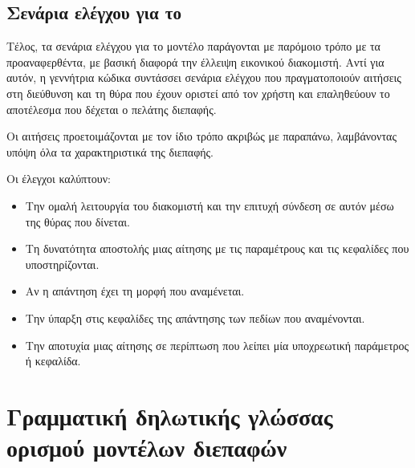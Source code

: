 \subsection{Σενάρια ελέγχου για το }

Τέλος, τα σενάρια ελέγχου για το μοντέλο  παράγονται με παρόμοιο τρόπο με τα προαναφερθέντα,
με βασική διαφορά την έλλειψη εικονικού διακομιστή.
Αντί για αυτόν, η γεννήτρια κώδικα συντάσσει σενάρια ελέγχου που πραγματοποιούν αιτήσεις στη διεύθυνση και τη θύρα που έχουν οριστεί από τον χρήστη
και επαληθεύουν το αποτέλεσμα που δέχεται ο πελάτης διεπαφής.

Οι αιτήσεις προετοιμάζονται με τον ίδιο τρόπο ακριβώς με παραπάνω,
λαμβάνοντας υπόψη όλα τα χαρακτηριστικά της διεπαφής.

Οι έλεγχοι καλύπτουν:
\begin{itemize}
    \item Την ομαλή λειτουργία του διακομιστή και την επιτυχή σύνδεση σε αυτόν μέσω της θύρας που δίνεται.
    \item Τη δυνατότητα αποστολής μιας αίτησης με τις παραμέτρους και τις κεφαλίδες που υποστηρίζονται.
    \item Αν η απάντηση έχει τη μορφή που αναμένεται.
    \item Την ύπαρξη στις κεφαλίδες της απάντησης των πεδίων που αναμένονται.
    \item Την αποτυχία μιας αίτησης σε περίπτωση που λείπει μία υποχρεωτική παράμετρος ή κεφαλίδα.
\end{itemize}

\section{Γραμματική δηλωτικής γλώσσας ορισμού μοντέλων διεπαφών}

